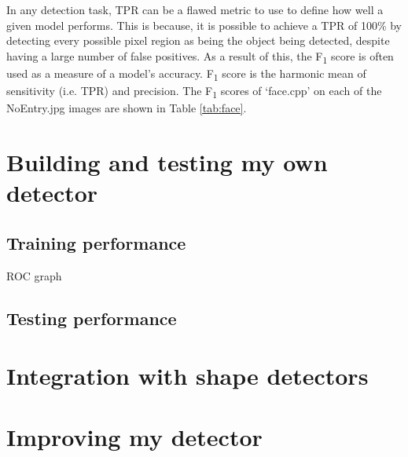 \documentclass[onecolumn, 11pt, a4paper]{article}
\begin{document}
In any detection task, TPR can be a flawed metric to use to define how well a given model performs.
This is because, it is possible to achieve a TPR of 100\% by detecting every possible pixel region as being the object being detected, despite having a large number of false positives.
As a result of this, the F\textsubscript{1} score is often used as a measure of a model's accuracy.
F\textsubscript{1} score is the harmonic mean of sensitivity (i.e. TPR) and precision.
The F\textsubscript{1} scores of `face.cpp' on each of the NoEntry\textasteriskcentered.jpg images are shown in Table \ref{tab:face}.



\clearpage

\section{Building and testing my own detector}

\subsection{Training performance}

ROC graph

\subsection{Testing performance}

\section{Integration with shape detectors}

\section{Improving my detector}



\clearpage

\printbibliography
    
\end{document}
